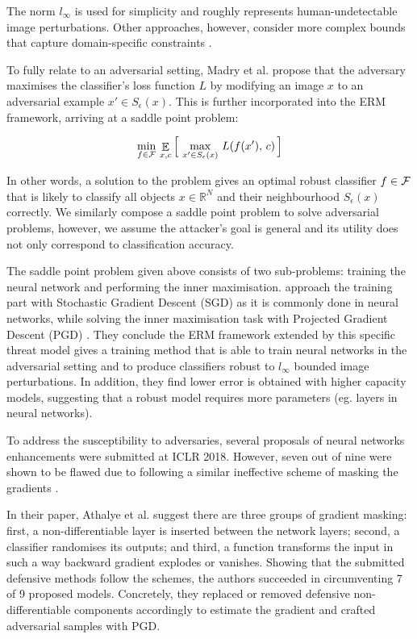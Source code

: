 The norm $l_\infty$ is used for simplicity and roughly represents
human-undetectable image perturbations. Other approaches, however,
consider more complex bounds that capture domain-specific constraints
\cite{adversarial_examples_glasses}.

To fully relate to an adversarial setting, Madry et al. \cite{towards_deep_learning_models} propose that
the adversary maximises the classifier's loss function $L$ by
modifying an image $x$ to an adversarial example
$x' \in S_\epsilon(x)$. This is further incorporated into the ERM
framework, arriving at a saddle point problem:

\begin{equation}
\min_{f \in \mathcal{F}} \, \mathop{\mathbb{E}}_{x, c} \Big[\, \max_{x' \in S_\epsilon (x)} \,  L(f(x'), \, c) \,\Big]
\end{equation}

In other words, a solution to the problem gives an optimal robust
classifier $f \in \mathcal{F}$ that is likely to classify all objects
$x \in \mathbb{R}^N$ and their neighbourhood $S_\epsilon (x)$
correctly. We similarly compose a saddle point problem to solve adversarial problems, however, we assume the attacker's goal is general and its utility does not only correspond to classification accuracy.

The saddle point problem given above consists of two sub-problems:
training the neural network and performing the inner maximisation.
\cite{towards_deep_learning_models} approach the training part with Stochastic Gradient
Descent (SGD) as it is commonly done in neural networks, while solving
the inner maximisation task with Projected Gradient Descent (PGD)
\cite{pgd}. They conclude the ERM framework extended by this
specific threat model gives a training method that is able to train
neural networks in the adversarial setting and to produce classifiers
robust to $l_\infty$ bounded image perturbations. In addition, they
find lower error is obtained with higher capacity models, suggesting
that a robust model requires more parameters (eg. layers in neural
networks).

To address the susceptibility to adversaries, several proposals of
neural networks enhancements were submitted at ICLR 2018. However, seven
out of nine were shown to be flawed due to following a similar
ineffective scheme of masking the gradients \cite{obfuscated_gradients}.

In their paper, Athalye et al. \cite{obfuscated_gradients} suggest there are three groups of
gradient masking: first, a non-differentiable layer is inserted between
the network layers; second, a classifier randomises its outputs; and
third, a function transforms the input in such a way backward gradient
explodes or vanishes. Showing that the submitted defensive methods
follow the schemes, the authors succeeded in circumventing 7 of 9
proposed models. Concretely, they replaced or removed defensive
non-differentiable components accordingly to estimate the gradient and
crafted adversarial samples with PGD.

